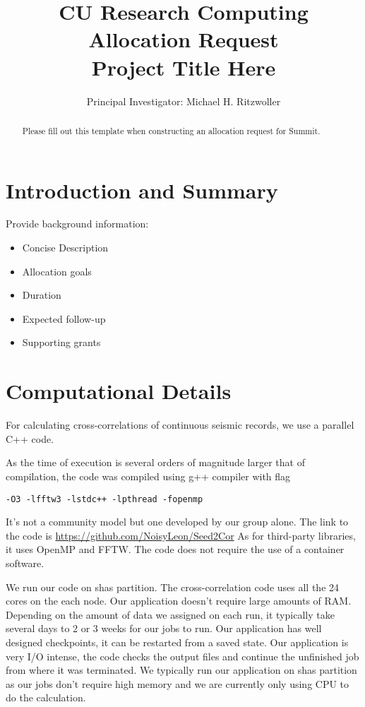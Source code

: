 



\title{%
\bf{CU Research Computing Allocation Request} \\
\Large Project Title Here
}
\author{Principal Investigator:  Michael H. Ritzwoller}
\date{}							%

\maketitle

\begin{abstract}
    Please fill out this template when constructing an allocation request for Summit.
\end{abstract}

\section{Introduction and Summary}

Provide background information:
\begin{itemize}
\item Concise Description
\item Allocation goals
\item Duration
\item Expected follow-up
\item Supporting grants
\end{itemize}


\section{Computational Details}

For calculating cross-correlations of continuous seismic records,
we use a parallel C++ code.

As the time of execution is several orders of magnitude
larger that of compilation,
the code was compiled using g++ compiler
with flag
\begin{lstlisting}
-O3 -lfftw3 -lstdc++ -lpthread -fopenmp
\end{lstlisting}

It's not a community model but one developed by our group alone.
The link to the code is \url{https://github.com/NoisyLeon/Seed2Cor}
As for third-party libraries, it uses OpenMP and FFTW.
The code does not require the use of a container software.

We run our code on shas partition.
The cross-correlation code uses all the 24 cores on the each node.
Our application doesn't require large amounts of RAM.
Depending on the amount of data we assigned on each run,
it typically take several days to 2 or 3 weeks for our jobs to run.
Our application has well designed checkpoints,
it can be restarted from a saved state.
Our application is very I/O intense,
the code checks the output files and
continue the unfinished job from where it was terminated.
We typically run our application on shas partition
as our jobs don't require high memory and
we are currently only using CPU to do the calculation.

